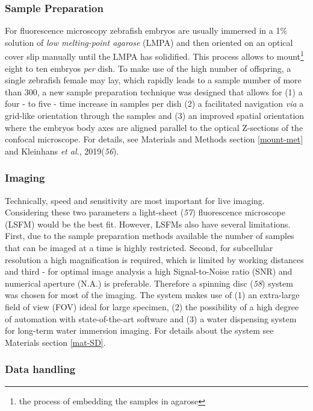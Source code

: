 \documentclass[11pt,singlespacinge,twoside]{reedthesis} %
\theoremstyle{definition}
\theoremstyle{definition}
\theoremstyle{definition}
\theoremstyle{remark}
\begin{document}
\hypertarget{sample-preparation}{%
\subsubsection{Sample Preparation}\label{sample-preparation}}

For fluorescence microscopy zebrafish embryos are usually immersed in a 1\(\%\) solution of \emph{low melting-point agarose} (LMPA) and then oriented on an optical cover slip manually until the LMPA has solidified. This process allows to mount\footnote{the process of embedding the samples in agarose} eight to ten embryos \emph{per} dish. To make use of the high number of offspring, a single zebrafish female may lay, which rapidly leads to a sample number of more than 300, a new sample preparation technique was designed that allows for (1) a four - to five - time increase in samples per dish (2) a facilitated navigation \emph{via} a grid-like orientation through the samples and (3) an improved spatial orientation where the embryos body axes are aligned parallel to the optical Z-sections of the confocal microscope. For details, see Materials and Methods section \ref{mount-met} and Kleinhans \emph{et al.}, 2019(\emph{56}).

\hypertarget{imaging}{%
\subsubsection{Imaging}\label{imaging}}

Technically, speed and sensitivity are most important for live imaging. Considering these two parameters a light-sheet (\emph{57}) fluorescence microscope (LSFM) would be the best fit. However, LSFMs also have several limitations. First, due to the sample preparation methods available the number of samples that can be imaged at a time is highly restricted. Second, for subcellular resolution a high magnification is required, which is limited by working distances and third - for optimal image analysis a high Signal-to-Noise ratio (SNR) and numerical aperture (N.A.) is preferable. Therefore a spinning disc (\emph{58}) system was chosen for most of the imaging.
The system makes use of (1) an extra-large field of view (FOV) ideal for large specimen, (2) the possibility of a high degree of automation with state-of-the-art software and (3) a water dispensing system for long-term water immersion imaging. For details about the system see Materials section \ref{mat-SD}.

\hypertarget{data-handling}{%
\subsubsection{Data handling}\label{data-handling}}
\end{document}
